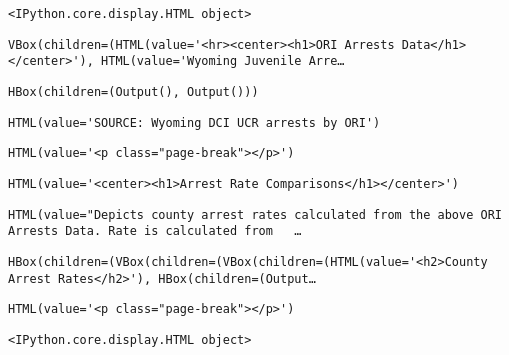 \documentclass[11pt]{article}
\begin{document}
    
    \begin{verbatim}
<IPython.core.display.HTML object>
    \end{verbatim}

    
    
    \begin{verbatim}
VBox(children=(HTML(value='<hr><center><h1>ORI Arrests Data</h1></center>'), HTML(value='Wyoming Juvenile Arre…
    \end{verbatim}

    
    
    \begin{verbatim}
HBox(children=(Output(), Output()))
    \end{verbatim}

    
    
    \begin{verbatim}
HTML(value='SOURCE: Wyoming DCI UCR arrests by ORI')
    \end{verbatim}

    
    
    \begin{verbatim}
HTML(value='<p class="page-break"></p>')
    \end{verbatim}

    
    
    \begin{verbatim}
HTML(value='<center><h1>Arrest Rate Comparisons</h1></center>')
    \end{verbatim}

    
    
    \begin{verbatim}
HTML(value="Depicts county arrest rates calculated from the above ORI Arrests Data. Rate is calculated from   …
    \end{verbatim}

    
    
    \begin{verbatim}
HBox(children=(VBox(children=(VBox(children=(HTML(value='<h2>County Arrest Rates</h2>'), HBox(children=(Output…
    \end{verbatim}

    
    
    \begin{verbatim}
HTML(value='<p class="page-break"></p>')
    \end{verbatim}

    
    
    \begin{verbatim}
<IPython.core.display.HTML object>
    \end{verbatim}
\end{document}
